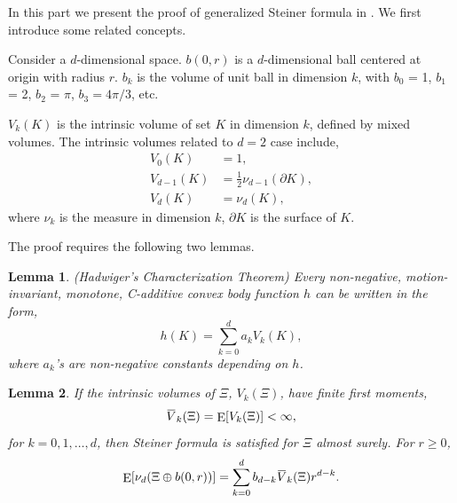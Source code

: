 \documentclass[10pt, conference, letterpaper]{IEEEtran}
\newtheorem{lemma}{Lemma}
\DeclareMathOperator*{\E}{\mathrm{E}}
\newcommand{\overbar}[1]{\mkern 1.5mu\overline{\mkern-1.5mu#1\mkern-1.5mu}\mkern 1.5mu}
\begin{document}
In this part we present the proof of generalized Steiner formula in \cite{stochasticapp}. We first introduce some related concepts.

Consider a $d$-dimensional space. 
$b(0,r)$ is a $d$-dimensional ball centered at origin with radius $r$.
$b_k$ is the volume of unit ball in dimension $k$, with $b_0$ = 1, $b_1$ = 2, $b_2$ = $\pi$, $b_3 = 4\pi/3$,  etc.

$V_k(K)$ is the intrinsic volume of set $K$ in dimension $k$, defined by mixed volumes.
The intrinsic volumes related to $d=2$ case include,
\begin{align*}
V_0(K) & = 1, \\
V_{d - 1}(K) & = \frac{1}{2}\nu_{d-1}(\partial K), \\
V_{d}(K) & = \nu_d(K),
\end{align*}
where $\nu_k$ is the measure in dimension $k$, $\partial K$ is the surface of $K$.

The proof requires the following two lemmas. 
\begin{lemma}\label{lemma:characterization}
	(Hadwiger's Characterization Theorem) Every non-negative, motion-invariant, monotone, C-additive convex body function $h$ can be written in the form, 
	\begin{equation}\label{characterization}
	h(K) = \sum\limits_{k=0}^{d}a_kV_k(K),
	\end{equation}
	where $a_k$'s are non-negative constants depending on $h$.
\end{lemma}
\begin{lemma}\label{lemma:steiner}
	If the intrinsic volumes of $\Xi$, $V_k(\Xi)$, have finite first moments,
	\begin{equation*}
	\overbar{V}_k(\Xi) = \E[V_k(\Xi)]<\infty,
	\end{equation*}
	for $k=0,1,\ldots, d$, then Steiner formula is satisfied for $\Xi$ almost surely. For $r\geq 0$, 
	\begin{equation}
	\E[\nu_d(\Xi \oplus b(0,r))] = \sum\limits_{k=0}^{d}b_{d-k}\overbar{V}_k(\Xi)r^{d-k}.
	\end{equation}
\end{lemma}
\end{document}
